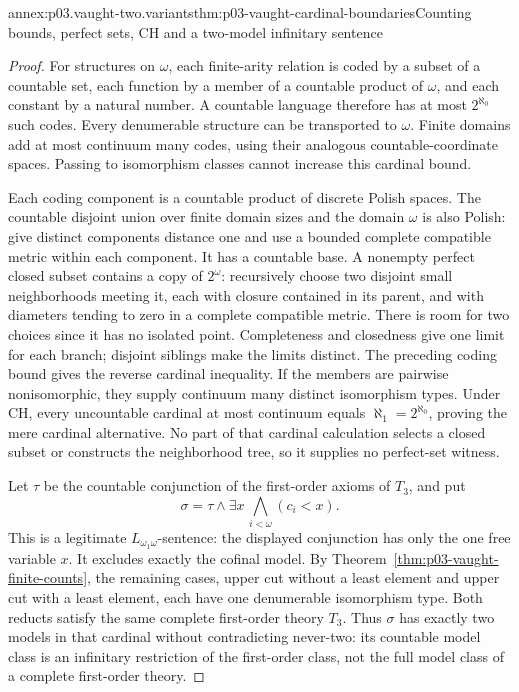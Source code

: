 \begin{annexitem}{annex:p03.vaught-two.variants}{thm:p03-vaught-cardinal-boundaries}{Counting bounds, perfect sets, CH and a two-model infinitary sentence}
\begin{proof}
For structures on \(\omega\), each finite-arity relation is coded by a
subset of a countable set, each function by a member of a countable product
of \(\omega\), and each constant by a natural number. A countable
language therefore has at most \(2^{\aleph_0}\) such codes. Every
denumerable structure can be transported to \(\omega\). Finite domains
add at most continuum many codes, using their analogous countable-coordinate
spaces. Passing to isomorphism classes cannot increase this cardinal bound.

Each coding component is a countable product of discrete Polish spaces.
The countable disjoint union over finite domain sizes and the domain
\(\omega\) is also Polish: give distinct components distance one and use
a bounded complete compatible metric within each component. It has a
countable base. A nonempty perfect closed
subset contains a copy of \(2^\omega\): recursively choose two disjoint
small neighborhoods meeting it, each with closure contained in its parent,
and with diameters tending to zero in a complete compatible metric.
There is room for two choices since it has no isolated point. Completeness
and closedness give one limit for each branch; disjoint siblings make the
limits distinct. The preceding coding bound gives the reverse cardinal
inequality. If the members are pairwise nonisomorphic, they supply continuum
many distinct isomorphism types. Under CH, every uncountable cardinal at
most continuum equals \(\aleph_1=2^{\aleph_0}\), proving the mere
cardinal alternative. No part of that cardinal calculation selects a closed
subset or constructs the neighborhood tree, so it supplies no perfect-set
witness.

Let \(\tau\) be the countable conjunction of the first-order axioms of
\(T_3\), and put
\[
 \sigma=\tau\wedge\exists x\,\bigwedge_{i<\omega}(c_i<x).
\]
This is a legitimate \(L_{\omega_1\omega}\)-sentence: the displayed
conjunction has only the one free variable \(x\). It excludes exactly
the cofinal model. By Theorem~\ref{thm:p03-vaught-finite-counts}, the
remaining cases, upper cut without a least element and upper cut with a
least element, each have one denumerable isomorphism type. Both reducts
satisfy the same complete first-order theory \(T_3\). Thus \(\sigma\)
has exactly two models in that cardinal without contradicting never-two:
its countable model class is an infinitary restriction of the first-order
class, not the full model class of a complete first-order theory.
\end{proof}
\end{annexitem}

